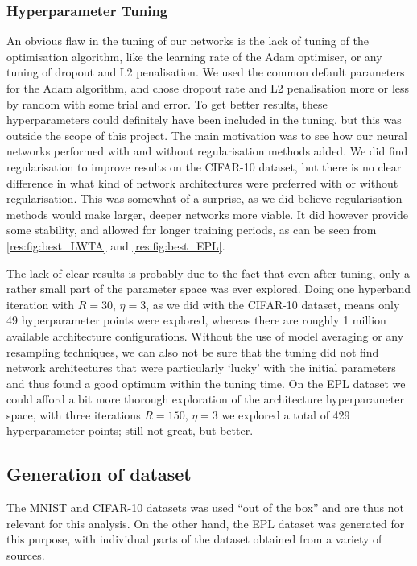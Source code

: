 \subsubsection{Hyperparameter Tuning}
    An obvious flaw in the tuning of our networks is the lack of tuning of the optimisation algorithm, like the learning rate of the Adam optimiser, or any tuning of dropout and L2 penalisation. We used the common default parameters for the Adam algorithm, and chose dropout rate and L2 penalisation more or less by random with some trial and error. To get better results, these hyperparameters could definitely have been included in the tuning, but this was outside the scope of this project. The main motivation was to see how our neural networks performed with and without regularisation methods added.
    We did find regularisation to improve results on the CIFAR-10 dataset, but there is no clear difference in what kind of network architectures were preferred with or without regularisation. This was somewhat of a surprise, as we did believe regularisation methods would make larger, deeper networks more viable. It did however provide some stability, and allowed for longer training periods, as can be seen from \cref{res:fig:best_LWTA} and \cref{res:fig:best_EPL}.

    The lack of clear results is probably due to the fact that even after tuning, only a rather small part of the parameter space was ever explored. Doing one hyperband iteration with $R=30$, $\eta=3$, as we did with the CIFAR-10 dataset, means only 49 hyperparameter points were explored, whereas there are roughly 1 million available architecture configurations. Without the use of model averaging or any resampling techniques, we can also not be sure that the tuning did not find network architectures that were particularly `lucky' with the initial parameters and thus found a good optimum within the tuning time. On the EPL dataset we could afford a bit more thorough exploration of the architecture hyperparameter space, with three iterations $R=150$, $\eta=3$ we explored a total of 429 hyperparameter points; still not great, but better.
    
    \subsection{Generation of dataset}
        The MNIST and CIFAR-10 datasets was used ``out of the box'' and are thus not relevant for this analysis. On the other hand, the EPL dataset was generated for this purpose, with individual parts of the dataset obtained from a variety of sources.
        
